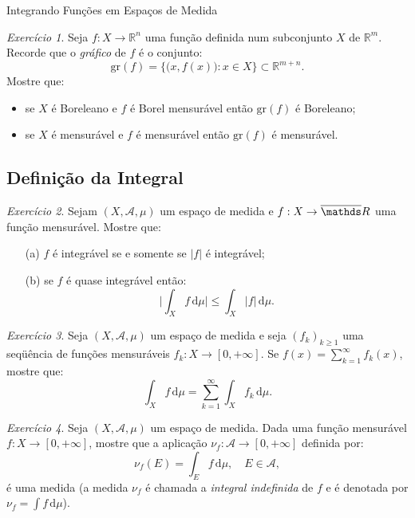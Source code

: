 \documentclass[oneside,final,11pt]{amsbook}
\newcommand{\R}{\mathds R}
\newcommand{\dd}{\mathrm d}
\newcommand{\Gr}{\mathrm{gr}}
\theoremstyle{remark}\newtheorem{exercise}{Exercício}[chapter]
\theoremstyle{remark}\newtheorem{*exercise}[exercise]{\hbox to 0pt{\hskip 0pt minus 1fil*}Exercício}
\theoremstyle{definition}\newtheorem{exdefin}{Definição}[chapter]
\theoremstyle{plain}\newtheorem{teo}{Teorema}[section]
\theoremstyle{plain}\newtheorem{lem}[teo]{Lema}
\theoremstyle{plain}\newtheorem{prop}[teo]{Proposição}
\theoremstyle{plain}\newtheorem{cor}[teo]{Corolário}
\theoremstyle{definition}\newtheorem{defin}[teo]{Definição}
\theoremstyle{remark}\newtheorem{rem}[teo]{Observação}
\theoremstyle{definition}\newtheorem{notation}[teo]{Notação}
\theoremstyle{definition}\newtheorem{convention}[teo]{Convenção}
\theoremstyle{definition}\newtheorem{example}[teo]{Exemplo}
\numberwithin{section}{chapter}
\numberwithin{equation}{section}
\begin{document}
\begin{chapter}{Integrando Funções em Espaços de Medida}
\begin{exercise}\label{thm:graficomens}
Seja $f:X\to\R^n$ uma função definida num subconjunto $X$ de $\R^m$. Recorde que o
{\em gráfico\/}
de $f$ é o conjunto:\index[simbolos]{$\Gr(f)$}
\begin{equation}\label{eq:defGrf}
\Gr(f)=\big\{\big(x,f(x)\big):x\in X\big\}\subset\R^{m+n}.
\end{equation}
Mostre que:
\begin{itemize}
\item se $X$ é Boreleano e $f$ é Borel mensurável então $\Gr(f)$ é Boreleano;
\item se $X$ é mensurável e $f$ é mensurável então $\Gr(f)$ é mensurável.
\end{itemize}
\end{exercise}

\subsection*{Definição da Integral}

\begin{exercise}\label{exe:moduloint}
Sejam $(X,\mathcal A,\mu)$ um espaço de medida e $f:X\to\overline\R$ uma função mensurável.
Mostre que:
\begin{itemize}
\item[(a)] $f$ é integrável se e somente se $\vert f\vert$ é integrável;
\item[(b)] se $f$ é quase integrável então:
\[\Big\vert\int_Xf\,\dd\mu\Big\vert\le\int_X\vert f\vert\,\dd\mu.\]
\end{itemize}
\end{exercise}

\begin{exercise}\label{exe:intserienneg}
Seja $(X,\mathcal A,\mu)$ um espaço de medida e seja $(f_k)_{k\ge1}$ uma seqüência de funções
mensuráveis $f_k:X\to[0,+\infty]$. Se $f(x)=\sum_{k=1}^\infty f_k(x)$, mostre que:
\[\int_X f\,\dd\mu=\sum_{k=1}^\infty\int_X f_k\,\dd\mu.\]
\end{exercise}

\begin{exercise}\label{exe:integralindef}
Seja $(X,\mathcal A,\mu)$ um espaço de medida. Dada uma função mensurável $f:X\to[0,+\infty]$,
mostre que a aplicação $\nu_f:\mathcal A\to[0,+\infty]$ definida por:
\[\nu_f(E)=\int_Ef\,\dd\mu,\quad E\in\mathcal A,\]
é uma medida (a medida $\nu_f$ é chamada a {\em integral indefinida\/}
de $f$ e é denotada por $\nu_f=\int f\,\dd\mu$\index[simbolos]{$\int f\,\dd\mu$}).
\end{exercise}


\end{chapter}
\end{document}
